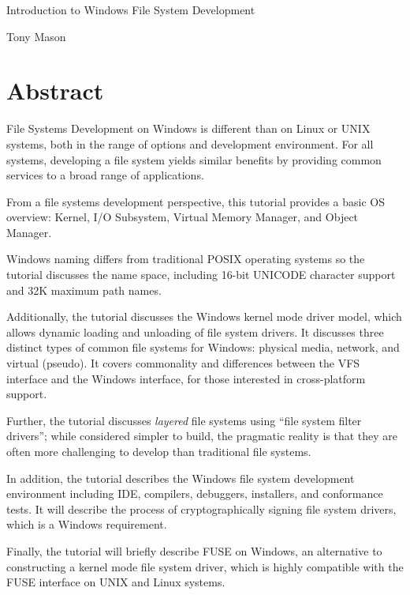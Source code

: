 \documentclass[letter,11pt]{article}
\begin{document}
\begin{center}
    {\MakeUppercase\Huge Introduction to Windows File System Development}

    \vspace{0.5cm}
    
    {\MakeUppercase\Large Tony Mason}

\end{center}

\section*{Abstract}

File Systems Development on Windows is different than on Linux or UNIX systems, both in the range of options and development environment.  For all systems, developing a file system yields similar benefits by providing common services to a broad range of applications.

From a file systems development perspective, this tutorial provides a basic OS overview: Kernel, I/O Subsystem, Virtual Memory Manager, and Object Manager.  

Windows naming differs from traditional POSIX operating systems so the tutorial discusses the name space, including 16-bit UNICODE character support and 32K maximum path names.

Additionally, the tutorial discusses the Windows kernel mode driver model, which allows dynamic loading and unloading of file system drivers.  It discusses three distinct types of common file systems for Windows: physical media, network, and virtual (pseudo).  It covers commonality and differences between the VFS interface and the Windows interface, for those interested in cross-platform support.

Further, the tutorial discusses \textit{layered} file systems using ``file system filter drivers''; while considered simpler to build, the pragmatic reality is that they are often more challenging to develop than traditional file systems.

In addition, the tutorial describes the Windows file system development environment including IDE, compilers, debuggers, installers, and conformance tests. It will describe the process of cryptographically signing file system drivers, which is a Windows requirement.

Finally, the tutorial will briefly describe FUSE on Windows, an alternative to constructing a kernel mode file system driver, which is highly compatible with the FUSE interface on UNIX and Linux systems.
\end{document}
